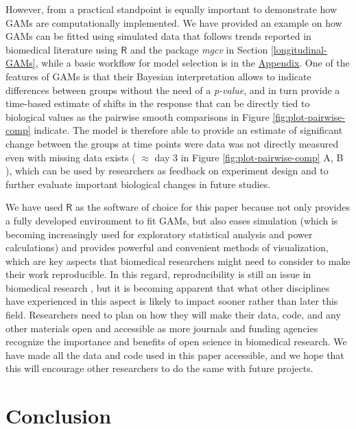 \documentclass[Royal,times,doublespace,sagev]{sagej}
\begin{document}
However, from a practical standpoint is equally important to demonstrate how GAMs are computationally implemented. We have provided an example on how GAMs can be fitted using simulated data that follows trends reported in biomedical literature \cite{vishwanath2009} using \(\textsf{R}\) and the package \emph{mgcv}\cite{wood2017} in Section \ref{longitudinal-GAMs}, while a basic workflow for model selection is in the \protect\hyperlink{workflow}{Appendix}. One of the features of GAMs is that their Bayesian interpretation allows to indicate differences between groups without the need of a \emph{p-value}, and in turn provide a time-based estimate of shifts in the response that can be directly tied to biological values as the pairwise smooth comparisons in Figure \ref{fig:plot-pairwise-comp} indicate. The model is therefore able to provide an estimate of significant change between the groups at time points were data was not directly measured even with missing data exists ( \(\approx\) day 3 in Figure \ref{fig:plot-pairwise-comp} A, B ), which can be used by researchers as feedback on experiment design and to further evaluate important biological changes in future studies.

We have used \(\textsf{R}\) as the software of choice for this paper because not only provides a fully developed environment to fit GAMs, but also eases simulation (which is becoming increasingly used for exploratory statistical analysis and power calculations) and provides powerful and convenient methods of visualization, which are key aspects that biomedical researchers might need to consider to make their work reproducible. In this regard, reproducibility is still an issue in biomedical research \cite{begley2015, weissgerber2018}, but it is becoming apparent that what other disciplines have experienced in this aspect is likely to impact sooner rather than later this field. Researchers need to plan on how they will make their data, code, and any other materials open and accessible as more journals and funding agencies recognize the importance and benefits of open science in biomedical research. We have made all the data and code used in this paper accessible, and we hope that this will encourage other researchers to do the same with future projects.

\hypertarget{conclusion}{%
\section{Conclusion}\label{conclusion}}
\end{document}
